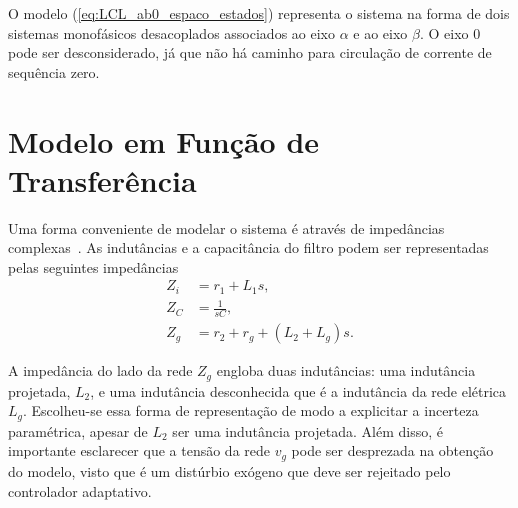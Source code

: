     O modelo (\ref{eq:LCL_ab0_espaco_estados}) representa o sistema na forma de dois sistemas monofásicos desacoplados associados ao eixo $\alpha$ e ao eixo $\beta$. O eixo $0$ pode ser desconsiderado, já que não há caminho para circulação de corrente de sequência zero.

\section{Modelo em Função de Transferência}

    Uma forma conveniente de modelar o sistema é através de impedâncias complexas~\cite{ref:XU}. As indutâncias e a capacitância do filtro podem ser representadas pelas seguintes impedâncias
    \begin{equation}
        \begin{split}
            Z_i & = r_1 + L_1 s \text{,} \\
            Z_C & = \frac{1}{s C} \text{,} \\
            Z_g & = r_2 + r_g + \left( L_2 + L_g \right) s \text{.}
        \end{split}
    \end{equation}

    A impedância do lado da rede $Z_g$ engloba duas indutâncias: uma indutância projetada, $L_2$, e uma indutância desconhecida que é a indutância da rede elétrica $L_g$. Escolheu-se essa forma de representação de modo a explicitar a incerteza paramétrica, apesar de $L_2$ ser uma indutância projetada. Além disso, é importante esclarecer que a tensão da rede $v_g$ pode ser desprezada na obtenção do modelo, visto que é um distúrbio exógeno que deve ser rejeitado pelo controlador adaptativo.




